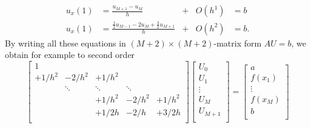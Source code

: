 \begin{equation*}
\begin{aligned}
u_x(1) & = \frac{u_{M+1}-u_M}{h} & + & O(h^1) & = b\\
u_x(1) & = \frac{\frac{1}{2}u_{M-1}-2u_M+\frac{3}{2}u_{M+1}}{h} & + & O(h^2) & = b.
\end{aligned}
\end{equation*}
By writing all these equations in $(M+2) \times (M+2)$-matrix form $AU=b$, we obtain for example to second order
\begin{equation*}
\renewcommand{\arraystretch}{1.5} %
\begin{bmatrix}
1 \\
+1/h^2 & -2/h^2 & +1/h^2 &   \\
  & \ddots & \ddots & \ddots & \\
  &   & +1/h^2 & -2/h^2 & +1/h^2 \\
  &   & +1/2h & -2/h & +3/2h \\
\end{bmatrix}
\begin{bmatrix}
U_0 \\ U_1 \\ \vdots \\ U_M \\ U_{M+1} \\
\end{bmatrix}
=
\begin{bmatrix}
a \\ f(x_1) \\ \vdots \\ f(x_M) \\ b \\
\end{bmatrix}
\end{equation*}

